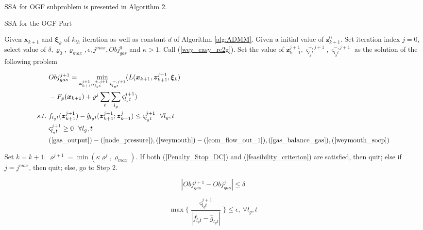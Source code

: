 \documentclass[journal]{IEEEtran}
\begin{document}
SSA for OGF subproblem is presented in Algorithm 2.
\begin{algorithm}[ht]
\caption{SSA for the OGF Part}
\label{alg:Improved_CCP}
\begin{algorithmic}[1]
\STATE Given ${\boldsymbol{{x}}}_{k+1}$ and ${\boldsymbol{{\xi}}}_k$ of $k_{th}$ iteration as well as constant $d$ of Algorithm \ref{alg:ADMM}. Given a initial value of ${\boldsymbol{{z}}}_{k+1}^{0}$. Set iteration index $j=0$, select value of $\delta, \varrho_0, \varrho_{max}, \epsilon, j^{max}, Obj_{gas}^{0}$ and $\kappa>1$.
\STATE Call (\ref{wey_easy_re2g}). Set the value of ${\boldsymbol{{z}}}_{k+1}^{j+1},\varsigma_{l_gt}^{+,j+1},\varsigma_{l_gt}^{-,j+1}$ as the solution of the following problem
\begin{spacing}{0.4}
\begin{equation}
\begin{split}\label{Improved_Penalty_DC_basic_con}
&Obj_{gas}^{j+1}=\min_{{\boldsymbol{{z}}}_{k+1}^{j+1},\varsigma_{l_gt}^{+,j+1},\varsigma_{l_gt}^{-,j+1}}(L({\boldsymbol{{x}}}_{k+1},{\boldsymbol{{z}}}_{k+1}^{j+1},{\boldsymbol{{\xi}}}_{k})\\
&-F_p({\boldsymbol{{x}}}_{k+1})+\varrho^j\sum_{t}\sum_{l_g}\varsigma_{l_gt}^{j+1})\\
s.t.~&f_{l_gt}({\boldsymbol{{z}}}_{k+1}^{j+1})-\hat{g}_{l_gt}({\boldsymbol{{z}}}_{k+1}^{j+1};{\boldsymbol{{z}}}_{k+1}^{j})\le \varsigma_{l_gt}^{j+1}~~\forall l_g,t\\
&\varsigma_{l_gt}^{j+1}\ge 0~~\forall l_g,t\\
&(\ref{gas_output})-(\ref{node_pressure}), (\ref{weymouth})-(\ref{com_flow_out_1}), (\ref{gas_balance_gas}),(\ref{weymouth_socp})
\end{split}
\end{equation}
\end{spacing}
\STATE Set $k=k+1$. $\varrho^{j+1}=\min(\kappa\varrho^j,\varrho_{max})$. If both (\ref{Penalty_Stop_DC}) and (\ref{feasibility_criterion}) are satisfied, then quit; else if $j=j^{max}$, then quit; else, go to Step 2.
\begin{spacing}{0.5}
\begin{equation}\label{Penalty_Stop_DC}
  |Obj_{gas}^{j+1}-Obj_{gas}^{j}|\le\delta
\end{equation}

\begin{equation}\label{feasibility_criterion}
\max\{\frac{\varsigma^{j+1}_{l_gt}}{|f_{l_gt}-\hat{g}_{l_gt}|}\}\le\epsilon,~\forall l_g,t
\end{equation}
\end{spacing}
\end{algorithmic}
\end{algorithm}
\end{document}
